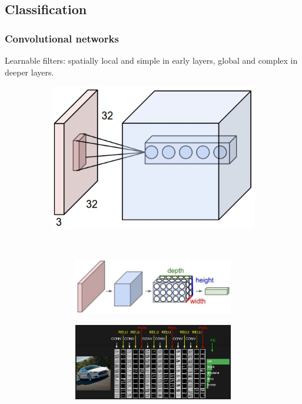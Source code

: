 \documentclass{beamer}
\begin{document}
	\subsection[Classification]{Classification}
	\begin{frame}
		\frametitle{Convolutional networks}
		Learnable filters: spatially local and simple in early layers, global and complex in deeper layers.
		\begin{figure}[h]
			\centering
			\begin{subfigure}{0.4\textwidth}
				\includegraphics[width=\textwidth]{plots/convLayer.jpeg}
			\end{subfigure}
			~
			\begin{subfigure}{0.5\textwidth}
				\begin{subfigure}{\textwidth}
					\includegraphics[width=\textwidth]{plots/convNetVolumes.jpeg}
				\end{subfigure}
				\par \smallskip
				\begin{subfigure}{\textwidth}
					\includegraphics[width=\textwidth]{plots/convNetExample.jpeg}

\end{subfigure}
\end{subfigure}
\end{figure}
\end{frame}
\end{document}
